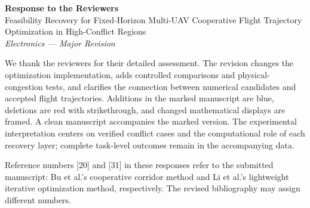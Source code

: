 \documentclass[11pt,a4paper]{article}
\begin{document}
\begin{center}{\Large\bfseries Response to the Reviewers}\\[8pt]{\large Feasibility Recovery for Fixed-Horizon Multi-UAV Cooperative Flight Trajectory Optimization in High-Conflict Regions}\\[6pt]\emph{Electronics --- Major Revision}\end{center}
We thank the reviewers for their detailed assessment. The revision changes the optimization implementation, adds controlled comparisons and physical-congestion tests, and clarifies the connection between numerical candidates and accepted flight trajectories. Additions in the marked manuscript are blue, deletions are red with strikethrough, and changed mathematical displays are framed. A clean manuscript accompanies the marked version. The experimental interpretation centers on verified conflict cases and the computational role of each recovery layer; complete task-level outcomes remain in the accompanying data.

Reference numbers [20] and [31] in these responses refer to the submitted manuscript: Bu et al.'s cooperative corridor method and Li et al.'s lightweight iterative optimization method, respectively. The revised bibliography may assign different numbers.

\end{document}
